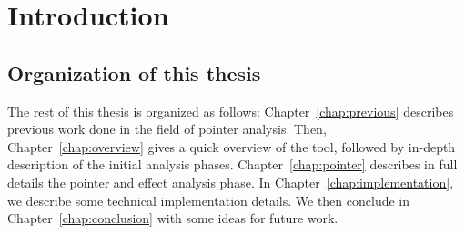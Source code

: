 \chapter{Introduction} \label{chap:intro}
%

\section{Organization of this thesis}
The rest of this thesis is organized as follows: Chapter~\ref{chap:previous}
describes previous work done in the field of pointer analysis.  Then,
Chapter~\ref{chap:overview} gives a quick overview of the tool, followed by
in-depth description of the initial analysis phases.
Chapter~\ref{chap:pointer} describes in full details the pointer and effect
analysis phase.  In Chapter~\ref{chap:implementation}, we describe some
technical implementation details. We then conclude in
Chapter~\ref{chap:conclusion} with some ideas for future work.

